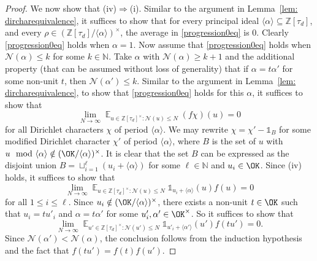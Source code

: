 \documentclass[11pt]{amsart}
\theoremstyle{definition}
\DeclareMathOperator*{\E}{\mathbb{E}}
\newcommand{\N}{{\mathbb N}}
\newcommand{\NN}{{\mathcal N}}
\newcommand{\Z}{{\mathbb Z}}
\newcommand{\FM}[1]{{\color{violet}{{#1}}}}
\begin{document}
\begin{proof}
We now show that (iv)$\Rightarrow$(i). 
Similar to the argument in Lemma~\ref{lem: dircharequivalence},
it suffices to show that for every principal ideal $\langle \alpha\rangle \subseteq \Z[\tau_{d}]$, and every $\rho \in (\Z[\tau_{d}]/\langle \alpha \rangle)^{\times}$, the average in \eqref{progression0eq} is 0. Clearly \eqref{progression0eq} holds  when $\alpha=1$. Now assume that \eqref{progression0eq} holds  when $\NN(\alpha)\leq k$ for some $k\in\N$. Take $\alpha$ with $\NN(\alpha)\geq k+1$ and the additional property (that can be assumed without loss of generality) that if $\alpha=t\alpha'$ for some non-unit $t$, then $\NN(\alpha')\leq k$. Similar to the argument in Lemma~\ref{lem: dircharequivalence}, to show that \eqref{progression0eq} holds for this $\alpha$, it suffices to show that 
 \begin{equation}\nonumber%
        \lim_{N\to\infty}\E_{u\in\Z[\tau_{d}]^{\times}\colon \NN(u)\leq N}(f\chi)(u)=0
        \end{equation}
for all Dirichlet characters $\chi$ of period $\langle\alpha\rangle$. We may rewrite  $\chi=\chi'-\mathds{1}_{B}$ for some modified Dirichlet character $\chi'$ of period $\langle \alpha\rangle$,  where $B$ is the set of $u$ with $u \mod \langle \alpha\rangle\notin (\OK/\langle \alpha\rangle)^{\times}$. It is clear that the set $B$ can be expressed as the disjoint union $B=\sqcup_{i=1}^{\ell}(u_{i}+\langle \alpha\rangle)$ for some $\ell\in\N$ and $u_{i}\in\OK$. Since (iv) holds, it suffices to show that 
 \begin{equation}\nonumber%
\lim_{N\to\infty}\E_{u\in\Z[\tau_{d}]^{\times}\colon \NN(u)\leq N}\mathds{1}_{u_{i}+\langle \alpha\rangle}(u)f(u)=0
        \end{equation}
for all $1\leq i\leq \ell$. Since $u_{i}\notin (\OK/\langle \alpha\rangle)^{\times}$, there exists a non-unit $t\in\OK$ such that $u_{i}=tu'_{i}$ and $\alpha=t\alpha'$ for some $u'_{i},\alpha'\in\OK^{\times}$. So it suffices to show that
\begin{equation}\nonumber%
\lim_{N\to\infty}\E_{u'\in\Z[\tau_{d}]^{\times}\colon \NN(u')\leq N}\mathds{1}_{u'_{i}+\langle \alpha'\rangle}(u')f(tu')=0.
        \end{equation} 
 Since $\NN(\alpha')<\NN(\alpha)$, the conclusion follows from the induction hypothesis and the fact that $f(tu')=f(t)f(u')$.

\end{proof}
\end{document}
